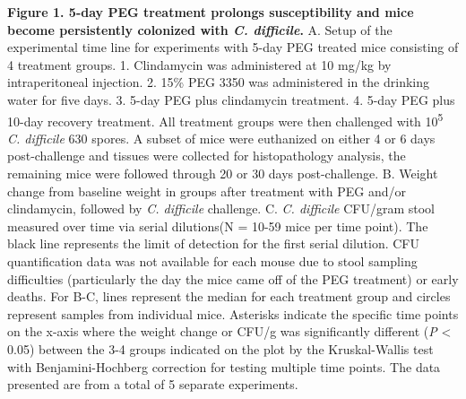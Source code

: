 \documentclass[
  11pt,
]{article}
\begin{document}
\textbf{Figure 1. 5-day PEG treatment prolongs susceptibility and mice
become persistently colonized with \emph{C. difficile}.} A. Setup of the
experimental time line for experiments with 5-day PEG treated mice
consisting of 4 treatment groups. 1. Clindamycin was administered at 10
mg/kg by intraperitoneal injection. 2. 15\% PEG 3350 was administered in
the drinking water for five days. 3. 5-day PEG plus clindamycin
treatment. 4. 5-day PEG plus 10-day recovery treatment. All treatment
groups were then challenged with 10\textsuperscript{5} \emph{C.
difficile} 630 spores. A subset of mice were euthanized on either 4 or 6
days post-challenge and tissues were collected for histopathology
analysis, the remaining mice were followed through 20 or 30 days
post-challenge. B. Weight change from baseline weight in groups after
treatment with PEG and/or clindamycin, followed by \emph{C. difficile}
challenge. C. \emph{C. difficile} CFU/gram stool measured over time via
serial dilutions(N = 10-59 mice per time point). The black line
represents the limit of detection for the first serial dilution. CFU
quantification data was not available for each mouse due to stool
sampling difficulties (particularly the day the mice came off of the PEG
treatment) or early deaths. For B-C, lines represent the median for each
treatment group and circles represent samples from individual mice.
Asterisks indicate the specific time points on the x-axis where the
weight change or CFU/g was significantly different (\emph{P} \textless{}
0.05) between the 3-4 groups indicated on the plot by the Kruskal-Wallis
test with Benjamini-Hochberg correction for testing multiple time
points. The data presented are from a total of 5 separate experiments.
\newpage
\end{document}
